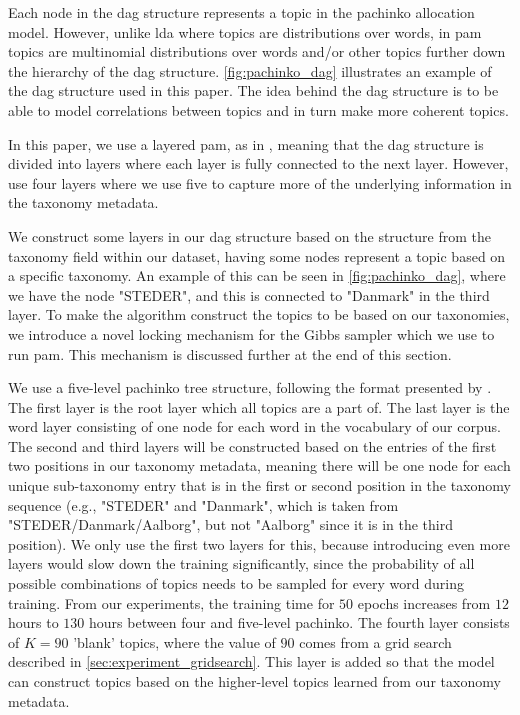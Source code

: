 Each node in the \gls{dag} structure represents a topic in the pachinko allocation model. 
However, unlike \gls{lda} where topics are distributions over words, in \gls{pam} topics are multinomial distributions over words and/or other topics further down the hierarchy of the \gls{dag} structure.
\autoref{fig:pachinko_dag} illustrates an example of the \gls{dag} structure used in this paper.
The idea behind the \gls{dag} structure is to be able to model correlations between topics and in turn make more coherent topics.
  
In this paper, we use a layered \gls{pam}, as in \cite{li2006pachinko}, meaning that the \gls{dag} structure is divided into layers where each layer is fully connected to the next layer.
However, \citet{li2006pachinko} use four layers where we use five to capture more of the underlying information in the taxonomy metadata.

We construct some layers in our \gls{dag} structure based on the structure from the taxonomy field within our dataset, having some nodes represent a topic based on a specific taxonomy.
An example of this can be seen in \autoref{fig:pachinko_dag}, where we have the node "STEDER", and this is connected to "Danmark" in the third layer.
To make the algorithm construct the topics to be based on our taxonomies, we introduce a novel locking mechanism for the Gibbs sampler which we use to run \gls{pam}.
This mechanism is discussed further at the end of this section.

We use a five-level pachinko tree structure, following the format presented by \citet{li2006pachinko}.
The first layer is the root layer which all topics are a part of.
The last layer is the word layer consisting of one node for each word in the vocabulary of our corpus.
The second and third layers will be constructed based on the entries of the first two positions in our taxonomy metadata, meaning there will be one node for each unique sub-taxonomy entry that is in the first or second position in the taxonomy sequence (e.g., "STEDER" and "Danmark", which is taken from "STEDER/Danmark/Aalborg", but not "Aalborg" since it is in the third position).
We only use the first two layers for this, because introducing even more layers would slow down the training significantly, since the probability of all possible combinations of topics needs to be sampled for every word during training.
From our experiments, the training time for $50$ epochs increases from $12$ hours to $130$ hours between four and five-level pachinko.
The fourth layer consists of $K = 90$ 'blank' topics, where the value of $90$ comes from a grid search described in \autoref{sec:experiment_gridsearch}.
This layer is added so that the model can construct topics based on the higher-level topics learned from our taxonomy metadata.

